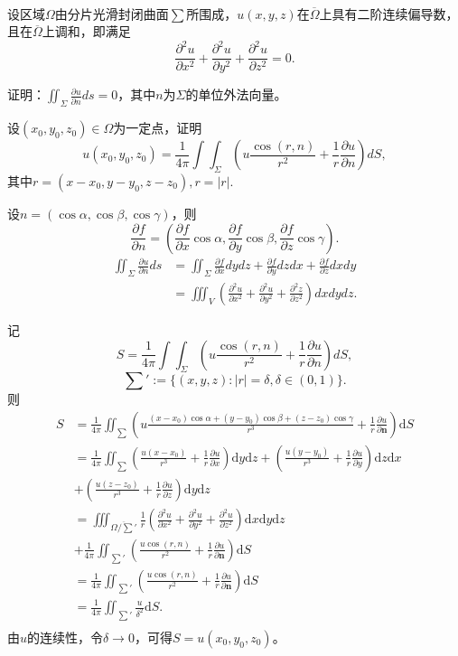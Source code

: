   \begin{exercise}
  \hfill\\
设区域$\Omega$由分片光滑封闭曲面$\sum$所围成，$u(x,y,z)$在$\overline{\Omega}$上具有二阶连续偏导数，且在$\overline{\Omega}$上调和，即满足
$$\frac{\partial^2u}{\partial x^2}+\frac{\partial^2u}{\partial y^2}+\frac{\partial^2u}{\partial z^2}=0.$$  
  
  证明：$\iint_{\Sigma}\frac{\partial u}{\partial n}ds=0$，其中$n$为$\Sigma$的单位外法向量。
  
  设$(x_0,y_0,z_0)\in\Omega$为一定点，证明
  $$u(x_0,y_0,z_0)=\frac1{4\pi}\int\int_{\Sigma}(u\frac{\cos(r,n)}{r^2}+\frac1r\frac{\partial u}{\partial n})dS,$$
  其中$r=(x-x_0,y-y_0,z-z_0),r=|r|.$  
  
   设$n=(\cos\alpha,\cos\beta,\cos\gamma)$，则
  $$\frac{\partial f}{\partial n}=(\frac{\partial f}{\partial x}\cos\alpha,\frac{\partial f}{\partial y}\cos\beta,\frac{\partial f}{\partial z}\cos\gamma).$$
  \begin{align*}
    \iint_{\Sigma}\frac{\partial u}{\partial n}ds&=\iint_{\Sigma}\frac{\partial f}{\partial x}dydz+\frac{\partial f}{\partial y}dzdx+\frac{\partial f}{\partial z}dxdy\\
    &=\iiint_V(\frac{\partial^2u}{\partial x^2}+\frac{\partial^2u}{\partial y^2}+\frac{\partial^2z}{\partial z^2})dxdydz.
  \end{align*} 
  
  记
$$S=\frac1{4\pi}\int\int_{\Sigma}(u\frac{\cos(r,n)}{r^2}+\frac1r\frac{\partial u}{\partial n})dS,$$
$$\sum':=\{(x,y,z):|r|=\delta,\delta\in(0,1)\}.$$
则
\begin{align*}
S&=\frac{1}{4\pi}\iint_{\sum}(u\frac{(x-x_0)\cos\alpha+(y-y_0)\cos\beta+(z-z_0)\cos\gamma}{r^3}+\frac{1}{r}\frac{\partial u}{\partial \textbf{n}})\mathrm{d}S\\
&=\frac{1}{4\pi}\iint_{\sum}(\frac{u(x-x_0)}{r^3}+\frac{1}{r}\frac{\partial u}{\partial x})\mathrm{d}y\mathrm{d}z
+(\frac{u(y-y_0)}{r^3}+\frac{1}{r}\frac{\partial u}{\partial y})\mathrm{d}z\mathrm{d}x\\
&+(\frac{u(z-z_0)}{r^3}+\frac{1}{r}\frac{\partial u}{\partial z})\mathrm{d}y\mathrm{d}z\\
&=\iiint_{\overline{\Omega/\sum'}}\frac{1}{r}(\frac{\partial^2u}{\partial x^2}+\frac{\partial^2u}{\partial y^2}+\frac{\partial^2u}{\partial z^2})\mathrm{d}x\mathrm{d}y\mathrm{d}z\\
&+\frac{1}{4\pi}\iint_{\sum'}(\frac{u\cos(r,n)}{r^2}+\frac{1}{r}\frac{\partial u}{\partial\textbf{n}})\mathrm{d}S\\
&=\frac{1}{4\pi}\iint_{\sum'}(\frac{u\cos(r,n)}{r^2}+\frac{1}{r}\frac{\partial u}{\partial\textbf{n}})\mathrm{d}S\\
&=\frac{1}{4\pi}\iint_{\sum'}\frac{u}{\delta^2}\mathrm{d}S.\\
\end{align*}
由$u$的连续性，令$\delta\rightarrow0$，可得$S=u(x_0,y_0,z_0)$。
  \end{exercise}
 
